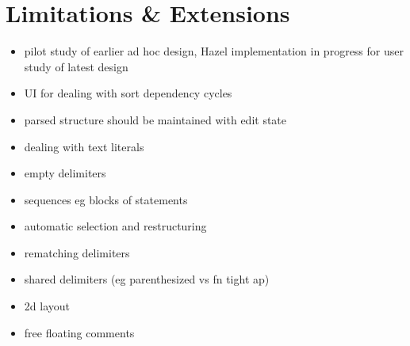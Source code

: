 \section{Limitations \& Extensions}

\begin{itemize}
\item pilot study of earlier ad hoc design, Hazel implementation in progress for user study of latest design
\item UI for dealing with sort dependency cycles
\item parsed structure should be maintained with edit state
\item dealing with text literals
\item empty delimiters
\item sequences eg blocks of statements
\item automatic selection and restructuring
\item rematching delimiters
\item shared delimiters (eg parenthesized vs fn tight ap)
\item 2d layout
\item free floating comments
\end{itemize}